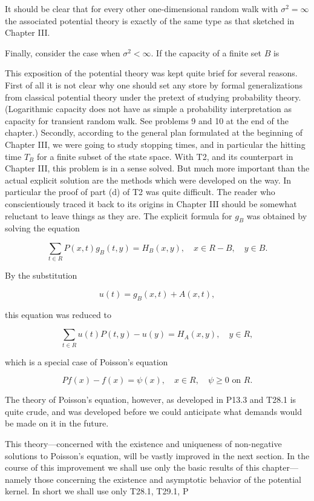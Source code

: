 It should be clear that for every other one-dimensional random walk with $\sigma^2 = \infty$ the associated potential theory is exactly of the same type as that sketched in Chapter III.

Finally, consider the case when $\sigma^2 < \infty$. If the capacity of a finite set $B$ is

This exposition of the potential theory was kept quite brief for several reasons. First of all it is not clear why one should set any store by formal generalizations from classical potential theory under the pretext of studying probability theory. (Logarithmic capacity does not have as simple a probability interpretation as capacity for transient random walk. See problems 9 and 10 at the end of the chapter.) Secondly, according to the general plan formulated at the beginning of Chapter III, we were going to study stopping times, and in particular the hitting time $T_B$ for a finite subset of the state space. With T2, and its counterpart in Chapter III, this problem is in a sense solved. But much more important than the actual explicit solution are the methods which were developed on the way. In particular the proof of part (d) of T2 was quite difficult. The reader who conscientiously traced it back to its origins in Chapter III should be somewhat reluctant to leave things as they are. The explicit formula for $g_B$ was obtained by solving the equation

$$\sum_{t \in R} P(x,t)g_B(t,y) = H_B(x,y), \quad x \in R - B, \quad y \in B.$$

By the substitution

$$u(t) = g_B(x,t) + A(x,t),$$

this equation was reduced to

$$\sum_{t \in R} u(t)P(t,y) - u(y) = H_A(x,y), \quad y \in R,$$

which is a special case of Poisson's equation

$$Pf(x) - f(x) = \psi(x), \quad x \in R, \quad \psi \geq 0 \text{ on } R.$$

The theory of Poisson's equation, however, as developed in P13.3 and T28.1 is quite crude, and was developed before we could anticipate what demands would be made on it in the future.

This theory—concerned with the existence and uniqueness of non-negative solutions to Poisson's equation, will be vastly improved in the next section. In the course of this improvement we shall use only the basic results of this chapter—namely those concerning the existence and asymptotic behavior of the potential kernel. In short we shall use only T28.1, T29.1, P